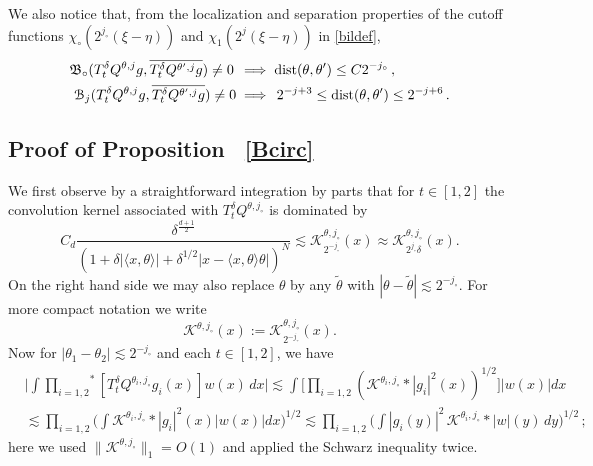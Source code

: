 \documentclass[11pt]{amsart}
\theoremstyle{definition}
\numberwithin{theorem}{section}
\numberwithin{definition}{section}
\def\prodstar{{\prod_{i=1,2}}^{\!\!*}}
\def\inn#1#2{\langle#1,#2\rangle}
\newcommand{\Be}{\begin{equation}}
\newcommand{\Ee}{\end{equation}}
\newcommand{\note}[1]{\footnote{\texttt{\Small #1}}}
\def\dist{{\text{\rm dist}}}
\def\inn#1#2{\langle#1,#2\rangle}
\def\lc{\lesssim}
\def\fB{{\mathfrak {B}}}
\def\cB{{\mathcal {B}}}
\def\cK{{\mathcal {K}}}
\begin{document}
We also notice that,  from the  localization and separation properties
 of the cutoff functions
$\chi_\circ(2^{j_\circ}(\xi-\eta))$ and  $\chi_1(2^{j}(\xi-\eta))$
in \eqref{bildef},
\Be\label{thetasep}
\begin{aligned}
\fB_\circ(T^\delta_t Q^{\theta,j} g, \overline{T^\delta_t Q^{\theta',j} g})\neq 0 \,
&\implies \dist(\theta,\theta')\le C 2^{-j_\circ}\, ,
\\
\cB_j(T^\delta_t Q^{\theta,j} g, \overline{T^\delta_t Q^{\theta',j} g})\neq 0
&\implies \, 2^{-j+3}\le \dist(\theta,\theta')\le 2^{-j+6}
\, .
\end{aligned}\Ee


\subsection*{Proof of Proposition ~\ref{Bcirc}}
We  first observe by a straightforward integration by parts
that for $t\in [1,2]$ the convolution kernel associated with 
$T^{\delta}_tQ^{\theta,j_{\circ}}$
is dominated by
$$C_d \frac{ \delta^{\frac{d+1}{2}}}{(1+\delta|\inn x\theta|+
\delta^{1/2}|x-\inn{x}{\theta}\theta|)^N} \lc
\cK^{\theta,j_{\circ}}_{2^{-j_{\circ}}}(x) \approx
\cK^{\theta,j_{\circ}}_{2^{j_{\circ}}\delta}(x). $$
On the right hand side
we may also replace $\theta$ by any $\widetilde \theta$ with
$|\theta-\widetilde\theta|\lc 2^{-j_\circ}$.
For more compact notation we write
$$\cK^{\theta,j_\circ}(x):=\cK^{\theta,j_{\circ}}_{2^{-j_{\circ}}}(x). $$
Now for $|\theta_1-\theta_2|\lc 2^{-j_\circ}$ and each $t\in [1,2]$,   we have
\begin{equation}
\label{straightf}
\begin{aligned}
&\Big|\int
\prodstar[T^{\delta}_tQ^{\theta_i,j_{\circ}}g_i(x)]
w(x)\,dx\Big|
\lc
\int \Big[\prod_{i=1,2}(\cK^{\theta_i,j_{\circ}}*  |g_i|^2(x))^{1/2}\Big] |w(x)| dx
\\
&\lc
\prod_{i=1,2}\Big( \int
\cK^{\theta_i,j_{\circ}} * |g_i|^2(x)
 |w(x)| dx\Big)^{1/2}
\lc
\prod_{i=1,2}\Big( \int |g_i(y)|^2
\,\cK^{\theta_i,j_{\circ}}
*  |w|(y)\,dy\Big)^{1/2}\,;
\end{aligned}
\end{equation}
here we used $\|\cK^{\theta,j_{\circ}}\|_1=O(1)$ and applied the Schwarz
inequality twice.
\end{document}
